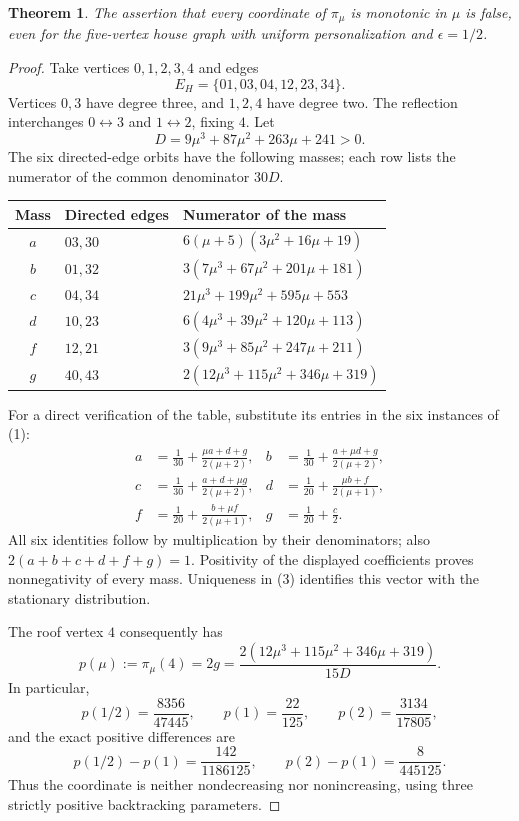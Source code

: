 \documentclass[11pt]{article}
\newtheorem{theorem}{Theorem}
\begin{document}
\begin{theorem}
The assertion that every coordinate of $\pi_\mu$ is monotonic in
$\mu$ is false, even for the five-vertex house graph with uniform
personalization and $\epsilon=1/2$.
\end{theorem}
\begin{proof}
Take vertices $0,1,2,3,4$ and edges
\[
 E_H=\{01,03,04,12,23,34\}.
\]
Vertices $0,3$ have degree three, and $1,2,4$ have degree two.
The reflection interchanges $0\leftrightarrow3$ and
$1\leftrightarrow2$, fixing $4$. Let
\[
 D=9\mu^3+87\mu^2+263\mu+241>0.
\]
The six directed-edge orbits have the following masses; each row
lists the numerator of the common denominator $30D$.
\begin{center}
\begin{tabular}{cll}
\toprule
Mass & Directed edges & Numerator of the mass\\
\midrule
$a$ & $03,30$ & $6(\mu+5)(3\mu^2+16\mu+19)$\\
$b$ & $01,32$ & $3(7\mu^3+67\mu^2+201\mu+181)$\\
$c$ & $04,34$ & $21\mu^3+199\mu^2+595\mu+553$\\
$d$ & $10,23$ & $6(4\mu^3+39\mu^2+120\mu+113)$\\
$f$ & $12,21$ & $3(9\mu^3+85\mu^2+247\mu+211)$\\
$g$ & $40,43$ & $2(12\mu^3+115\mu^2+346\mu+319)$\\
\bottomrule
\end{tabular}
\end{center}
For a direct verification of the table, substitute its entries in
the six instances of (1):
\begin{align*}
 a&=\frac1{30}+\frac{\mu a+d+g}{2(\mu+2)},&
 b&=\frac1{30}+\frac{a+\mu d+g}{2(\mu+2)},\\
 c&=\frac1{30}+\frac{a+d+\mu g}{2(\mu+2)},&
 d&=\frac1{20}+\frac{\mu b+f}{2(\mu+1)},\\
 f&=\frac1{20}+\frac{b+\mu f}{2(\mu+1)},&
 g&=\frac1{20}+\frac c2.
\end{align*}
All six identities follow by multiplication by their denominators;
also $2(a+b+c+d+f+g)=1$. Positivity of the displayed coefficients
proves nonnegativity of every mass. Uniqueness in (3) identifies
this vector with the stationary distribution.

The roof vertex $4$ consequently has
\[
 p(\mu):=\pi_\mu(4)=2g
 =\frac{2(12\mu^3+115\mu^2+346\mu+319)}{15D}.                 \tag{4}
\]
In particular,
\[
 p(1/2)=\frac{8356}{47445},\qquad
 p(1)=\frac{22}{125},\qquad
 p(2)=\frac{3134}{17805},
\]
and the exact positive differences are
\[
 p(1/2)-p(1)=\frac{142}{1186125},\qquad
 p(2)-p(1)=\frac8{445125}.                                    \tag{5}
\]
Thus the coordinate is neither nondecreasing nor nonincreasing,
using three strictly positive backtracking parameters.
\end{proof}
\end{document}
